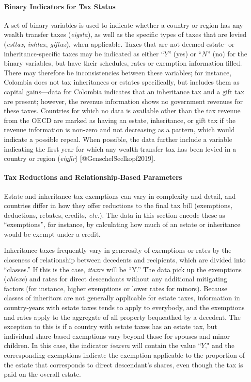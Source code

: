 \documentclass[
]{article}
\begin{document}
\paragraph{Binary Indicators for Tax
Status}\label{binary-indicators-for-tax-status}

A set of binary variables is used to indicate whether a country or
region has any wealth transfer taxes (\emph{eigsta}), as well as the
specific types of taxes that are levied (\emph{esttax}, \emph{inhtax},
\emph{giftax}), when applicable. Taxes that are not deemed estate- or
inheritance-specific taxes may be indicated as either ``\(Y\)'' (yes) or
``\(N\)'' (no) for the binary variables, but have their schedules, rates
or exemption information filled. There may therefore be inconsistencies
between these variables; for instance, Colombia does not tax
inheritances or estates specifically, but includes them as capital
gains---data for Colombia indicates that an inheritance tax and a gift
tax are present; however, the revenue information shows no government
revenues for these taxes. Countries for which no data is available other
than the tax revenue from the OECD are marked as having an estate,
inheritance, or gift tax if the revenue information is non-zero and not
decreasing as a pattern, which would indicate a possible repeal. When
possible, the data further include a variable indicating the first year
for which any wealth transfer tax has been levied in a country or region
(\emph{eigfir}) {[}@GenschelSeelkopf2019{]}.

\paragraph{Tax Reductions and Relationship-Based
Parameters}\label{subsubs:reb}

Estate and inheritance tax exemptions can vary in complexity and detail,
and countries differ in how they offer reductions to the final tax bill
(exemptions, deductions, rebates, credits, \emph{etc.}). The data in
this section encode these as ``exemptions'', for instance, by
calculating how much of an estate or inheritance would be exempt under a
credit.

Inheritance taxes frequently vary in generosity of exemptions or rates
by the closeness of relationship between decedents and recipients, which
are divided into ``classes.'' If this is the case, \emph{itaxre} will be
``Y.'' The data pick up the exemptions (\emph{chiexe}) and rates for
direct descendants without any additional mitigating factors (for
instance, higher exemptions or lower rates for minors). Because classes
of inheritors are not generally applicable for estate taxes, information
in country-years with estate taxes tends to apply to everybody, and the
exemptions and rates apply to the aggregate of all property bequeathed
by a decedent. The exception to this is if a country with estate taxes
has an estate tax, but individual share-based exemptions vary beyond
those for spouses and minor children. In this case, the indicator
\emph{ieexem} will contain the value ``\(Y\)," and the corresponding
exemptions indicate the exemption applicable to the proportion of the
estate that corresponds to direct descendant's shares, even though the
tax is paid on the overall estate.
\end{document}
